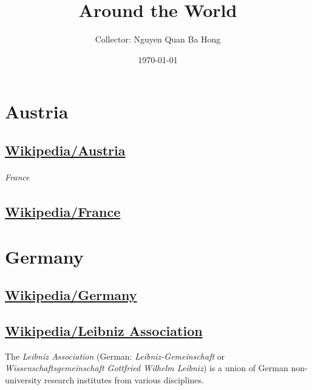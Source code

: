 \documentclass{book}
\title{Around the World}
\author{Collector: Nguyen Quan Ba Hong}
\date{\today}
\numberwithin{equation}{section}
\begin{document}
\maketitle
\setcounter{secnumdepth}{6}
\setcounter{tocdepth}{6}
\tableofcontents


\part{Austria}

\chapter{\href{https://en.wikipedia.org/wiki/Austria}{Wikipedia/Austria}}



\paragraph{France}

\chapter{\href{https://en.wikipedia.org/wiki/France}{Wikipedia/France}}




\part{Germany}

\chapter{\href{https://en.wikipedia.org/wiki/Germany}{Wikipedia/Germany}}


\chapter{\href{https://en.wikipedia.org/wiki/Leibniz_Association}{Wikipedia/Leibniz Association}}

The \textit{Leibniz Association} (German: \textit{Leibniz-Gemeinschaft} or \textit{Wissenschaftsgemeinschaft Gottfried Wilhelm Leibniz}) is a union of German non-university research institutes from various disciplines.
\end{document}
